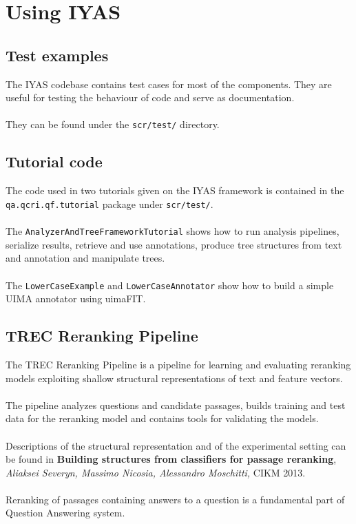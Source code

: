\documentclass{wileysev}
\begin{document}
\chapter[Using IYAS]{Using IYAS}

\section{Test examples}

The IYAS codebase contains test cases for most of the components. They are useful for testing the behaviour of code and serve as documentation.
\\\\
They can be found under the \texttt{scr/test/} directory.

\section{Tutorial code}

The code used in two tutorials given on the IYAS framework is contained in the\\ \texttt{qa.qcri.qf.tutorial} package under \texttt{scr/test/}.
\\\\
The \texttt{AnalyzerAndTreeFrameworkTutorial} shows how to run analysis pipelines, serialize results, retrieve and use annotations, produce tree structures from text and annotation and manipulate trees.
\\\\
The \texttt{LowerCaseExample} and \texttt{LowerCaseAnnotator} show how to build a simple UIMA annotator using uimaFIT.

\section{TREC Reranking Pipeline}

The TREC Reranking Pipeline is a pipeline for learning and evaluating reranking models exploiting shallow structural representations of text and feature vectors.
\\\\
The pipeline analyzes questions and candidate passages, builds training and test data for the reranking model and contains tools for validating the models.
\\\\
Descriptions of the structural representation and of the experimental setting can be found in \textbf{Building structures from classifiers for passage reranking}, \textit{Aliaksei Severyn,
Massimo Nicosia, Alessandro Moschitti,} CIKM 2013.
\\\\
Reranking of passages containing answers to a question is a fundamental part of Question Answering system. 
\end{document}
